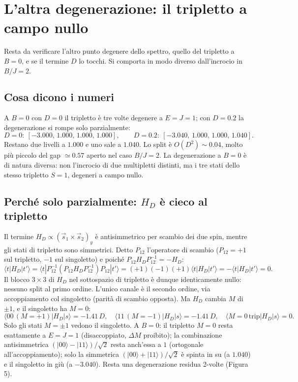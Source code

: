 \documentclass[11pt,a4paper]{article}
\begin{document}
\section{L'altra degenerazione: il tripletto a campo nullo}

Resta da verificare l'altro punto degenere dello spettro, quello del tripletto a
$B=0$, e se il termine $D$ lo tocchi. Si comporta in modo diverso dall'incrocio in
$B/J=2$.

\subsection{Cosa dicono i numeri}

A $B=0$ con $D=0$ il tripletto \`e tre volte degenere a $E=J=1$; con $D=0.2$ la
degenerazione si rompe solo parzialmente:
$$D=0:\ [-3.000,\,1.000,\,1.000,\,1.000], \qquad D=0.2:\ [-3.040,\,1.000,\,1.000,\,1.040].$$
Restano due livelli a $1.000$ e uno sale a $1.040$. Lo split \`e $O(D^2)\sim0.04$,
molto pi\`u piccolo del gap $\simeq0.57$ aperto nel caso $B/J=2$. La degenerazione a
$B=0$ \`e di natura diversa: non l'incrocio di due multipletti distinti, ma i tre
stati dello stesso tripletto $S=1$, degeneri a campo nullo.

\subsection{Perch\'e solo parzialmente: $H_D$ \`e cieco al tripletto}

Il termine $H_D\propto(\vec s_1\times\vec s_2)_y$ \`e antisimmetrico per scambio dei
due spin, mentre gli stati di tripletto sono simmetrici. Detto $P_{12}$ l'operatore di
scambio ($P_{12}=+1$ sul tripletto, $-1$ sul singoletto) e poich\'e
$P_{12}H_DP_{12}^{-1}=-H_D$:
\begin{equation}
\langle t|H_D|t'\rangle = \langle t|P_{12}^{-1}(P_{12}H_DP_{12}^{-1})P_{12}|t'\rangle = (+1)(-1)(+1)\langle t|H_D|t'\rangle = -\langle t|H_D|t'\rangle = 0.
\end{equation}
Il blocco $3\times3$ di $H_D$ nel sottospazio di tripletto \`e dunque identicamente
nullo: nessuno split al primo ordine. L'unico canale \`e il secondo ordine, via
accoppiamento col singoletto (parit\`a di scambio opposta). Ma $H_D$ cambia $M$ di
$\pm1$, e il singoletto ha $M=0$:
$$\langle00\,(M{=}{+}1)|H_D|s\rangle = -1.41\,D, \quad \langle11\,(M{=}{-}1)|H_D|s\rangle = -1.41\,D, \quad \langle M{=}0\,\text{trip}|H_D|s\rangle = 0.$$
Solo gli stati $M=\pm1$ vedono il singoletto. A $B=0$: il tripletto $M=0$ resta
esattamente a $E=J=1$ (disaccoppiato, $\Delta M$ proibito); la combinazione
antisimmetrica $(|00\rangle-|11\rangle)/\sqrt2$ resta anch'essa a $1$ (ortogonale
all'accoppiamento); solo la simmetrica $(|00\rangle+|11\rangle)/\sqrt2$ \`e spinta in
su (a $1.040$) e il singoletto in gi\`u (a $-3.040$). Resta una degenerazione residua
2-volte (Figura 5).
\end{document}
